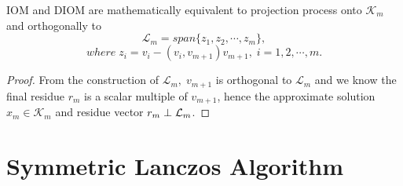 \documentclass[10pt,a4paper]{article}
\begin{document}
\begin{prop}
IOM and DIOM are mathematically equivalent to projection process onto $\mathcal{K}_m$ and orthogonally to
$$\mathcal{L}_m=span\{z_1,z_2,\cdots,z_m\},$$
$$where\;z_i=v_i-(v_i,v_{m+1})v_{m+1},\;i=1,2,\cdots,m.$$
\end{prop}

\begin{proof}
From the construction of $\mathcal{L}_m,\;v_{m+1}$ is orthogonal to $\mathcal{L}_m$ and we know the final residue $r_m$ is a scalar multiple of $v_{m+1}$, hence the approximate solution $x_m\in\mathcal{K}_m$ and residue vector $r_m\perp\\\mathcal{L}_m$.  
\end{proof}

\section{Symmetric Lanczos Algorithm}
\end{document}
